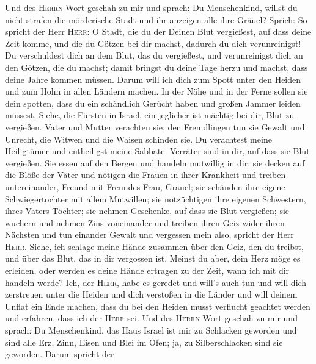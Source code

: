  Und des \textsc{Herrn} Wort geschah zu mir und sprach:
 Du Menschenkind, willst du nicht strafen die mörderische
Stadt und ihr anzeigen alle ihre Gräuel?  Sprich: So
spricht der Herr \textsc{Herr}: O Stadt, die du der Deinen Blut
vergießest, auf dass deine Zeit komme, und die du Götzen bei dir machst,
dadurch du dich verunreinigst!  Du verschuldest dich an
dem Blut, das du vergießest, und verunreinigst dich an den Götzen, die
du machst; damit bringst du deine Tage herzu und machst, dass deine
Jahre kommen müssen. Darum will ich dich zum Spott unter den Heiden und
zum Hohn in allen Ländern machen.  In der Nähe und in der
Ferne sollen sie dein spotten, dass du ein schändlich Gerücht haben und
großen Jammer leiden müssest.  Siehe, die Fürsten in
Israel, ein jeglicher ist mächtig bei dir, Blut zu vergießen.
 Vater und Mutter verachten sie, den Fremdlingen tun sie
Gewalt und Unrecht, die Witwen und die Waisen schinden sie.
 Du verachtest meine Heiligtümer und entheiligst meine
Sabbate.  Verräter sind in dir, auf dass sie Blut
vergießen. Sie essen auf den Bergen und handeln mutwillig in dir;
 sie decken auf die Blöße der Väter und nötigen die
Frauen in ihrer Krankheit  und treiben untereinander,
Freund mit Freundes Frau, Gräuel; sie schänden ihre eigene
Schwiegertochter mit allem Mutwillen; sie notzüchtigen ihre eigenen
Schwestern, ihres Vaters Töchter;  sie nehmen Geschenke,
auf dass sie Blut vergießen; sie wuchern und nehmen Zins voneinander und
treiben ihren Geiz wider ihren Nächsten und tun einander Gewalt und
vergessen mein also, spricht der Herr \textsc{Herr}. 
Siehe, ich schlage meine Hände zusammen über den Geiz, den du treibst,
und über das Blut, das in dir vergossen ist.  Meinst du
aber, dein Herz möge es erleiden, oder werden es deine Hände ertragen zu
der Zeit, wann ich mit dir handeln werde? Ich, der \textsc{Herr}, habe
es geredet und will's auch tun  und will dich zerstreuen
unter die Heiden und dich verstoßen in die Länder und will deinem Unflat
ein Ende machen,  dass du bei den Heiden musst verflucht
geachtet werden und erfahren, dass ich der \textsc{Herr} sei.
 Und des \textsc{Herrn} Wort geschah zu mir und sprach:
 Du Menschenkind, das Haus Israel ist mir zu Schlacken
geworden und sind alle Erz, Zinn, Eisen und Blei im Ofen; ja, zu
Silberschlacken sind sie geworden.  Darum spricht der
